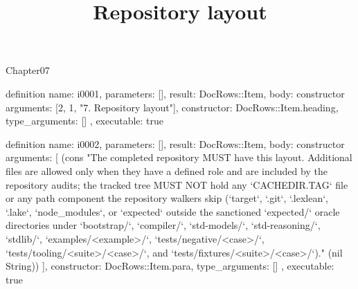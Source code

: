 \begin{lexlean}{Chapter07}
\title{Repository layout}
\begin{semanticmodule}
definition{
  name: i0001,
  parameters: [],
  result: DocRows::Item,
  body: constructor{
    arguments: [2, 1, "7. Repository layout"],
    constructor: DocRows::Item.heading,
    type_arguments: []
  },
  executable: true
}

definition{
  name: i0002,
  parameters: [],
  result: DocRows::Item,
  body: constructor{
    arguments: [
      (cons "The completed repository MUST have this layout. Additional files are allowed only when they have a defined role and are included by the repository audits; the tracked tree MUST NOT hold any `CACHEDIR.TAG` file or any path component the repository walkers skip (`target`, `.git`, `.lexlean`, `.lake`, `node_modules`, or `expected` outside the sanctioned `expected/` oracle directories under `bootstrap/`, `compiler/`, `std-models/`, `std-reasoning/`, `stdlib/`, `examples/<example>/`, `tests/negative/<case>/`, `tests/tooling/<suite>/<case>/`, and `tests/fixtures/<suite>/<case>/`)." (nil String))
    ],
    constructor: DocRows::Item.para,
    type_arguments: []
  },
  executable: true
}


\end{semanticmodule}
\end{lexlean}
